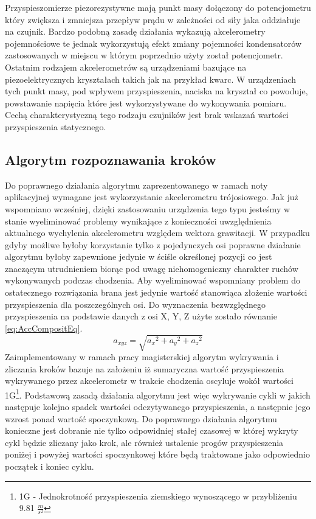 Przyspieszomierze piezorezystywne mają punkt masy dołączony do potencjometru
który zwiększa i zmniejsza przepływ prądu w zależności od siły jaka oddziałuje
na czujnik. Bardzo podobną zasadę działania wykazują akcelerometry pojemnościowe
te jednak wykorzystują efekt zmiany pojemności kondensatorów zastosowanych w
miejscu w którym poprzednio użyty został potencjometr. Ostatnim rodzajem
akcelerometrów są urządzeniami bazujące na piezoelektrycznych kryształach takich
jak na przykład kwarc. W urządzeniach tych punkt masy, pod wpływem
przyspieszenia, naciska na kryształ co powoduje, powstawanie napięcia które
jest wykorzystywane do wykonywania pomiaru. Cechą charakterystyczną tego rodzaju
czujników jest brak wskazań wartości przyspieszenia statycznego.\cite{website:elektronikab2b-platforma-bezzalogowa}

\subsection{Algorytm rozpoznawania kroków}
Do poprawnego działania algorytmu zaprezentowanego w ramach noty
aplikacyjnej\cite{Pedometer-haam326b} wymagane jest wykorzystanie akcelerometru
trójosiowego. Jak już wspomniano wcześniej, dzięki zastosowaniu urządzenia tego
typu jesteśmy w stanie wyeliminować problemy wynikające z konieczności 
uwzględnienia aktualnego wychylenia akcelerometru względem wektora grawitacji. 
W przypadku gdyby możliwe byłoby korzystanie tylko z pojedynczych osi poprawne
działanie algorytmu byłoby zapewnione jedynie w ściśle określonej pozycji co
jest znaczącym utrudnieniem biorąc pod uwagę niehomogeniczny charakter ruchów
wykonywanych podczas chodzenia. Aby wyeliminować wspomniany problem do
ostatecznego rozwiązania brana jest jedynie wartość stanowiąca złożenie wartości
przyspieszenia dla poszczególnych osi. Do wyznaczenia bezwzględnego
przyspieszenia na podstawie danych z osi X, Y, Z użyte zostało równanie
\ref{eq:AccCompositEq}.
\begin{equation}
a_{xyz} = \sqrt{{a_x}^2 + {a_y}^2 + {a_z}^2}
\label{eq:AccCompositEq}
\end{equation}
Zaimplementowany w ramach pracy magisterskiej algorytm wykrywania i zliczania
kroków bazuje na założeniu iż sumaryczna wartość przyspieszenia wykrywanego
przez akcelerometr w trakcie chodzenia oscyluje wokół wartości 1G\footnote{1G
- Jednokrotność przyspieszenia ziemskiego wynoszącego w przybliżeniu 9.81
$\frac{m}{s^2}$}. Podstawową zasadą działania algorytmu jest więc wykrywanie
cykli w jakich następuje kolejno spadek wartości odczytywanego przyspieszenia, a
następnie jego wzrost ponad wartość spoczynkową. Do poprawnego działania
algorytmu konieczne jest dobranie nie tylko odpowidniej stałej czasowej w której
wykryty cykl będzie zliczany jako krok, ale również ustalenie progów
przyspieszenia poniżej i powyżej wartości spoczynkowej które będą traktowane
jako odpowiednio początek i koniec cyklu.

